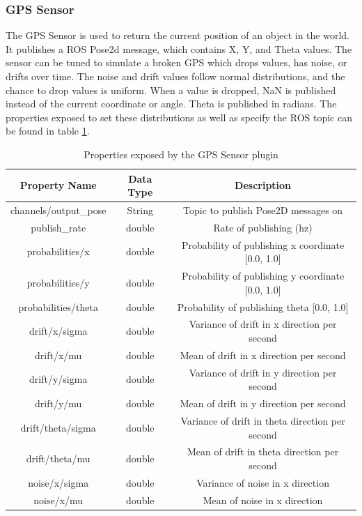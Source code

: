 \begin{itemize}
\subsubsection*{GPS Sensor}
The GPS Sensor is used to return the current position of an object in the world. It publishes a ROS Pose2d message, which contains
X, Y, and Theta values. The sensor can be tuned to simulate a broken GPS which drops values, has noise, or drifts over time. The noise and drift values follow normal distributions, and the chance to drop values is uniform. When a value is dropped, NaN is published instead of the current coordinate or angle. Theta is published in radians. The properties exposed to set these 
distributions as well as specify the ROS topic can be found in table \ref{tab:gps_props}.
	
\begin{table}[h!]
	\centering
	\caption{Properties exposed by the GPS Sensor plugin}
	\label{tab:gps_props}
	\begin{tabular}{c|c|c}
	Property Name & Data Type & Description\\ \hline \hline
	channels/output\_pose & String & Topic to publish Pose2D messages on\\ \hline
	publish\_rate & double & Rate of publishing (hz)\\ \hline
	probabilities/x & double & Probability of publishing x coordinate [0.0, 1.0]\\ \hline
	probabilities/y & double & Probability of publishing y coordinate [0.0, 1.0]\\ \hline
	probabilities/theta & double & Probability of publishing theta [0.0, 1.0]\\ \hline
	drift/x/sigma & double & Variance of drift in x direction per second\\ \hline
	drift/x/mu & double & Mean of drift in x direction per second\\ \hline
	drift/y/sigma & double & Variance of drift in y direction per second\\ \hline
	drift/y/mu & double & Mean of drift in y direction per second\\ \hline
	drift/theta/sigma & double & Variance of drift in theta direction per second\\ \hline
	drift/theta/mu & double & Mean of drift in theta direction per second\\ \hline
	noise/x/sigma & double & Variance of noise in x direction\\ \hline
	noise/x/mu & double & Mean of noise in x direction\\ \hline

\end{tabular}
\end{table}
\end{itemize}
